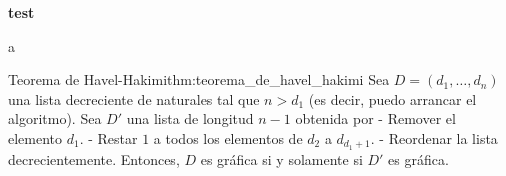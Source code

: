 \documentclass{fmbnotes}
\begin{document}
\newcommand*{\titulo}{test}
\portada{\titulo} 

\begin{center}
    {\Large\bfseries\sffamily \titulo}
\end{center}

a

\begin{teorema}{Teorema de Havel-Hakimi}{thm:teorema_de_havel_hakimi}
     Sea $D=(d_1,\ldots,d_n)$ una lista decreciente de naturales tal que $n>d_1$ (es decir, puedo arrancar el algoritmo).   Sea $D'$ una lista de longitud $n-1$ obtenida por   - Remover el elemento $d_1$.  - Restar $1$ a todos los elementos de $d_2$ a $d_{d_1+1}$.  - Reordenar la lista decrecientemente.   Entonces, $D$ es gráfica si y solamente si $D'$ es gráfica.
    
\end{teorema}
\end{document}
